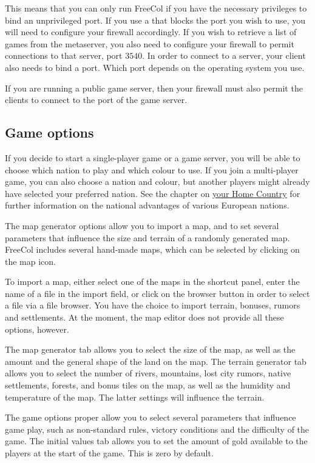 \documentclass[12pt]{book}
\begin{document}
This means that you can only run FreeCol if you have the necessary
privileges to bind an unprivileged port. If you use a
 that blocks the port you wish to use, you
will need to configure your firewall accordingly. If you wish to
retrieve a list of games from the metaserver, you also need to
configure your firewall to permit connections to that server, port
$3540$. In order to connect to a server, your client also needs to
bind a port. Which port depends on the operating system you use.

If you are running a public game server, then your firewall must also
permit the clients to connect to the port of the game server.


\hypertarget{Game options}{\subsection{Game options}}

If you decide to start a single-player game or a game server, you will
be able to choose which nation to play and which colour to use. If you
join a multi-player game, you can also choose a nation and colour, but
another players might already have selected your preferred nation. See
the chapter on \hyperlink{Home Country}{your Home Country} for further
information on the national advantages of various European nations.

The \hypertarget{map generator options}{map generator options} allow
you to import a map, and to set several parameters that influence the
size and terrain of a randomly generated map. FreeCol includes several
hand-made maps, which can be selected by clicking on the map icon.

To import a map, either select one of the maps in the shortcut panel,
enter the name of a file in the import field, or click on the browser
button in order to select a file via a file browser. You have the
choice to import terrain, bonuses, rumors and settlements. At the
moment, the map editor does not provide all these options, however.

The map generator tab allows you to select the size of the map, as
well as the amount and the general shape of the land on the map. The
terrain generator tab allows you to select the number of rivers,
mountains, lost city rumors, native settlements, forests, and bonus
tiles on the map, as well as the humidity and temperature of the
map. The latter settings will influence the terrain.

The game options proper allow you to select several parameters that
influence game play, such as non-standard rules, victory conditions
and the difficulty of the game. The initial values tab allows you to
set the amount of gold available to the players at the start of the
game. This is zero by default.
\end{document}
